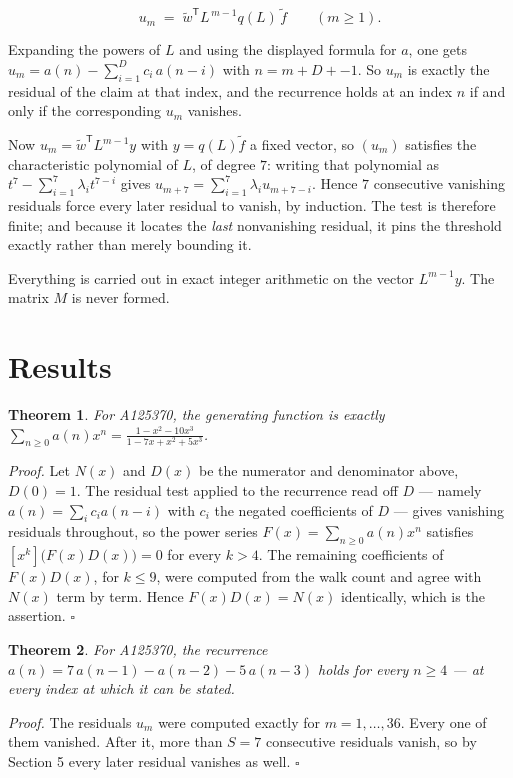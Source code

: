 \documentclass[11pt]{article}
\newtheorem{theorem}{Theorem}
\theoremstyle{definition}
\begin{document}
\[u_m \;=\; \tilde w^{\mathsf T} L^{\,m-1} q(L)\,\tilde f \qquad (m \ge 1).\]

Expanding the powers of $L$ and using the displayed formula for $a$, one gets $u_m = a(n) - \sum_{i=1}^{D} c_i\,a(n-i)$ with $n = m + D + -1$. So $u_m$ is exactly the residual of the claim at that index, and the recurrence holds at an index $n$ if and only if the corresponding $u_m$ vanishes.

Now $u_m = \tilde w^{\mathsf T} L^{m-1} y$ with $y = q(L)\tilde f$ a fixed vector, so $(u_m)$ satisfies the characteristic polynomial of $L$, of degree $7$: writing that polynomial as $t^{7} - \sum_{i=1}^{7} \lambda_i t^{7-i}$ gives $u_{m+7} = \sum_{i=1}^{7} \lambda_i u_{m+7-i}$. Hence $7$ consecutive vanishing residuals force every later residual to vanish, by induction. The test is therefore finite; and because it locates the {\itshape last} nonvanishing residual, it pins the threshold exactly rather than merely bounding it.

Everything is carried out in exact integer arithmetic on the vector $L^{m-1}y$. The matrix $M$ is never formed.

\section{Results}

\begin{theorem} For A125370, the generating function is exactly $\sum_{n\ge 0} a(n)x^n = \frac{1 - x^{2} - 10x^{3}}{1 - 7x + x^{2} + 5x^{3}}$.\end{theorem}

{\itshape Proof.} Let $N(x)$ and $D(x)$ be the numerator and denominator above, $D(0)=1$. The residual test applied to the recurrence read off $D$ --- namely $a(n) = \sum_i c_i a(n-i)$ with $c_i$ the negated coefficients of $D$ --- gives vanishing residuals throughout, so the power series $F(x)=\sum_{n\ge 0}a(n)x^n$ satisfies $[x^k]\bigl(F(x)D(x)\bigr) = 0$ for every $k > 4$. The remaining coefficients of $F(x)D(x)$, for $k \le 9$, were computed from the walk count and agree with $N(x)$ term by term. Hence $F(x)D(x) = N(x)$ identically, which is the assertion. $\square$

\begin{theorem} For A125370, the recurrence $a(n) = 7\,a(n-1) - a(n-2) - 5\,a(n-3)$ holds for every $n \ge 4$ --- at every index at which it can be stated.\end{theorem}

{\itshape Proof.} The residuals $u_m$ were computed exactly for $m = 1,\dots,36$. Every one of them vanished. After it, more than $S = 7$ consecutive residuals vanish, so by Section 5 every later residual vanishes as well. $\square$
\end{document}
